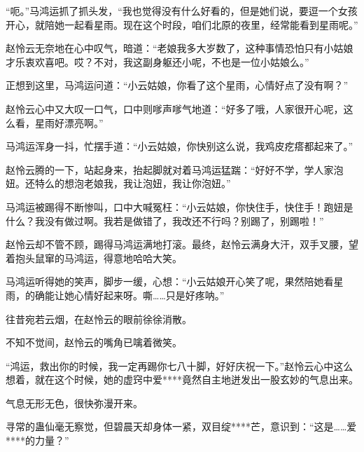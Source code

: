 \begin{this_body}
“呃。”马鸿运抓了抓头发，“我也觉得没有什么好看的，但是她们说，要逗一个女孩开心，就陪她一起看星雨。现在这个时段，咱们北原的夜里，经常能看到星雨呢。”

赵怜云无奈地在心中叹气，暗道：“老娘我多大岁数了，这种事情恐怕只有小姑娘才乐衷欢喜吧。哎？不对，我这副身躯还小呢，不也是一位小姑娘么。”

正想到这里，马鸿运问道：“小云姑娘，你看了这个星雨，心情好点了没有啊？”

赵怜云心中又大叹一口气，口中则嗲声嗲气地道：“好多了哦，人家很开心呢，这么看，星雨好漂亮啊。”

马鸿运浑身一抖，忙摆手道：“小云姑娘，你快别这么说，我鸡皮疙瘩都起来了。”

赵怜云腾的一下，站起身来，抬起脚就对着马鸿运猛踹：“好好不学，学人家泡妞。还特么的想泡老娘我，我让泡妞，我让你泡妞。”

马鸿运被踢得不断惨叫，口中大喊冤枉：“小云姑娘，你快住手，快住手！跑妞是什么？我没有做过啊。我若是做错了，我改还不行吗？别踢了，别踢啦！”

赵怜云却不管不顾，踢得马鸿运满地打滚。最终，赵怜云满身大汗，双手叉腰，望着抱头鼠窜的马鸿运，得意地哈哈大笑。

马鸿运听得她的笑声，脚步一缓，心想：“小云姑娘开心笑了呢，果然陪她看星雨，的确能让她心情好起来呀。嘶……只是好疼呐。”

往昔宛若云烟，在赵怜云的眼前徐徐消散。

不知不觉间，赵怜云的嘴角已噙着微笑。

“鸿运，救出你的时候，我一定再踢你七八十脚，好好庆祝一下。”赵怜云心中这么想着，就在这个时候，她的虚窍中爱****竟然自主地迸发出一股玄妙的气息出来。

气息无形无色，很快弥漫开来。

寻常的蛊仙毫无察觉，但碧晨天却身体一紧，双目绽****芒，意识到：“这是……爱****的力量？”

\end{this_body}

